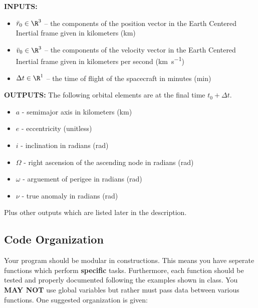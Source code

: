 \documentclass[11pt, reqno]{article}    %
\begin{document}
\noindent \textbf{INPUTS:}
\begin{itemize}
    \item \( \bar r_0 \in \R^{3} \) -- the components of the position vector in the Earth Centered Inertial frame given in kilometers (\si{\kilo\meter})
    \item \( \bar v_0 \in \R^{3} \) -- the components of the velocity vector in the Earth Centered Inertial frame given in kilometers per second (\si{\kilo\meter\per\second})
    \item \( \Delta t \in \R^{1} \) -- the time of flight of the spacecraft in minutes (\si{\minute})
\end{itemize}

\noindent \textbf{OUTPUTS:}
The following orbital elements are at the final time \( t_0 + \Delta t \).
\begin{itemize}
    \item \( a \)  - semimajor axis in kilometers (\si{\kilo\meter})
    \item \( e \) - eccentricity (unitless)
    \item \( i \) - inclination in radians (\si{\radian})
    \item \( \Omega \) - right ascension of the ascending node in radians (\si{\radian})
    \item \( \omega \) - arguement of perigee in radians (\si{\radian})
    \item \( \nu \) - true anomaly in radians (\si{\radian})
\end{itemize}
Plus other outputs which are listed later in the description.

\subsection*{Code Organization} 
Your program should be modular in constructions. 
This means you have seperate functions which perform \textbf{specific} tasks.
Furthermore, each function should be tested and properly documented following the examples shown in class.
You \textbf{MAY NOT}  use global variables but rather must pass data between various functions.
One suggested organization is given:
\end{document}
